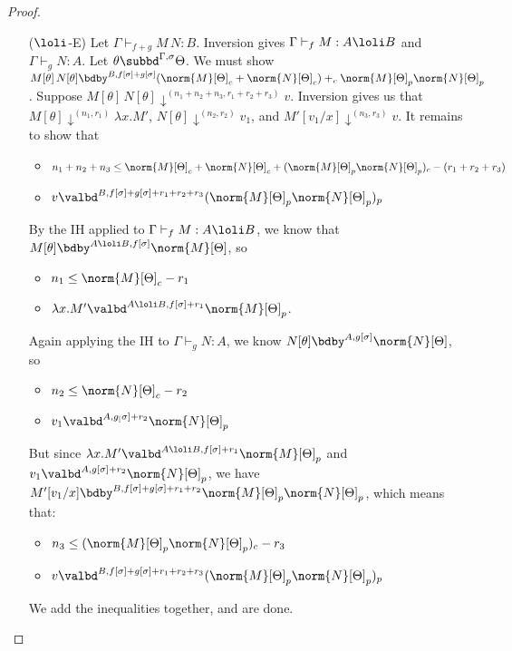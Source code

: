 \begin{proof}
\begin{itemize}
\item[($\loli$-E)] Let $\Gamma \vdash_{f + g} M \, N : B$.  Inversion gives $\Gamma \vdash_f M : A \loli B$ and $\Gamma \vdash_g N : A$. Let $\theta \subbd^{\Gamma,\sigma} \Theta$. We must show $M[\theta] \, N[\theta] \bdby^{B,f[\sigma] + g[\sigma]} (\norm{M}[\Theta]_c + \norm{N}[\Theta]_c) +_c \norm{M}[\Theta]_p\norm{N}[\Theta]_p$. Suppose $M[\theta] \, N[\theta] \downarrow^{(n_1+n_2+n_3,r_1+r_2+r_3)} v$. Inversion gives us that $M[\theta] \downarrow^{(n_1,r_1)} \lambda x.M'$, $N[\theta] \downarrow^{(n_2,r_2)} v_1$, and $M'[v_1/x] \downarrow^{(n_3,r_3)} v$. It remains to show that 
\begin{itemize}
  \item $n_1 + n_2 + n_3 \leq \norm{M}[\Theta]_c + \norm{N}[\Theta]_c + (\norm{M}[\Theta]_p\norm{N}[\Theta]_p)_c - (r_1 + r_2 + r_3)$
  \item $v \valbd^{B,f[\sigma] + g[\sigma] + r_1 + r_2 + r_3} (\norm{M}[\Theta]_p\norm{N}[\Theta]_p)_p$
\end{itemize}
 By the IH applied to $\Gamma \vdash_f M : A \loli B$, we know that $M[\theta] \bdby^{A\loli B,f[\sigma]} \norm{M}[\Theta]$, so
 \begin{itemize}
  \item $n_1 \leq \norm{M}[\Theta]_c - r_1$
  \item $\lambda x.M' \valbd^{A \loli B,f[\sigma] + r_1} \norm{M}[\Theta]_p$.
 \end{itemize}  
 Again applying the IH to $\Gamma \vdash_g N : A$, we know $N[\theta] \bdby^{A,g[\sigma]} \norm{N}[\Theta]$, so
\begin{itemize}
  \item $n_2 \leq \norm{N}[\Theta]_c - r_2$
  \item $v_1 \valbd^{A,g_[\sigma] + r_2} \norm{N}[\Theta]_p$
\end{itemize}
  
But since $\lambda x.M' \valbd^{A \loli B,f[\sigma] + r_1} \norm{M}[\Theta]_p$ and $v_1 \valbd^{A,g[\sigma] + r_2} \norm{N}[\Theta]_p$, we have $M'[v_1/x] \bdby^{B,f[\sigma] + g[\sigma] + r_1 + r_2} \norm{M}[\Theta]_p\norm{N}[\Theta]_p$, which means that:
\begin{itemize}
  \item $n_3 \leq (\norm{M}[\Theta]_p\norm{N}[\Theta]_p)_c - r_3$
  \item $v \valbd^{B,f[\sigma] + g[\sigma] + r_1 + r_2 + r_3} (\norm{M}[\Theta]_p\norm{N}[\Theta]_p)_p$
\end{itemize}
We add the inequalities together, and are done.


\end{itemize}
\end{proof}

